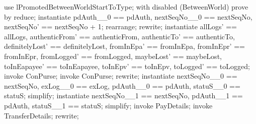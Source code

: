 \begin{LPScript}\begin{zproof}[tBetwStartToOkayPRE]
    use lPromotedBetweenWorldStartToType;
    with disabled (BetweenWorld) prove by reduce;
    instantiate pdAuth\_\_0 == pdAuth, nextSeqNo\_\_0 == nextSeqNo,
        nextSeqNo' == nextSeqNo + 1;
    rearrange;
    rewrite;
    instantiate allLogs' == allLogs, authenticFrom' == authenticFrom,
        authenticTo' == authenticTo, definitelyLost' == definitelyLost,
        fromInEpa' == fromInEpa, fromInEpr' == fromInEpr,
        fromLogged' == fromLogged, maybeLost' == maybeLost,
        toInEapayee' == toInEapayee, toInEpv' == toInEpv,
        toLogged' == toLogged;
    invoke \Delta ConPurse;
    invoke ConPurse;
    rewrite;
    instantiate nextSeqNo\_\_0 == nextSeqNo, exLog\_\_0 == exLog,
        pdAuth\_\_0 == pdAuth, statuS\_\_0 == statuS;
    simplify;
    instantiate nextSeqNo\_\_1 == nextSeqNo, pdAuth\_\_1 == pdAuth,
        statuS\_\_1 == statuS;
    simplify;
    invoke PayDetails;
    invoke TransferDetails;
    rewrite;
\end{zproof}\end{LPScript}


